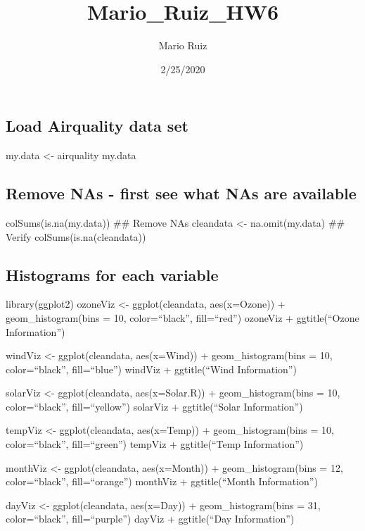 \documentclass[]{article}
\title{Mario\_Ruiz\_HW6}
\author{Mario Ruiz}
\date{2/25/2020}
\begin{document}
\maketitle

\hypertarget{load-airquality-data-set}{%
\subsection{Load Airquality data set}\label{load-airquality-data-set}}

my.data \textless{}- airquality my.data

\hypertarget{remove-nas---first-see-what-nas-are-available}{%
\subsection{Remove NAs - first see what NAs are
available}\label{remove-nas---first-see-what-nas-are-available}}

colSums(is.na(my.data)) \#\# Remove NAs cleandata \textless{}-
na.omit(my.data) \#\# Verify colSums(is.na(cleandata))

\hypertarget{histograms-for-each-variable}{%
\subsection{Histograms for each
variable}\label{histograms-for-each-variable}}

library(ggplot2) ozoneViz \textless{}- ggplot(cleandata, aes(x=Ozone)) +
geom\_histogram(bins = 10, color=``black'', fill=``red'') ozoneViz +
ggtitle(``Ozone Information'')

windViz \textless{}- ggplot(cleandata, aes(x=Wind)) +
geom\_histogram(bins = 10, color=``black'', fill=``blue'') windViz +
ggtitle(``Wind Information'')

solarViz \textless{}- ggplot(cleandata, aes(x=Solar.R)) +
geom\_histogram(bins = 10, color=``black'', fill=``yellow'') solarViz +
ggtitle(``Solar Information'')

tempViz \textless{}- ggplot(cleandata, aes(x=Temp)) +
geom\_histogram(bins = 10, color=``black'', fill=``green'') tempViz +
ggtitle(``Temp Information'')

monthViz \textless{}- ggplot(cleandata, aes(x=Month)) +
geom\_histogram(bins = 12, color=``black'', fill=``orange'') monthViz +
ggtitle(``Month Information'')

dayViz \textless{}- ggplot(cleandata, aes(x=Day)) + geom\_histogram(bins
= 31, color=``black'', fill=``purple'') dayViz + ggtitle(``Day
Information'')
\end{document}
